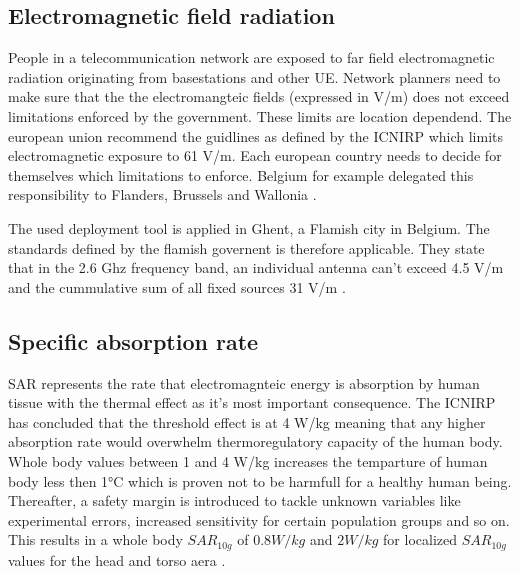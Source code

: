 \subsection{Electromagnetic field radiation} %
\label{sub:emf}
People in a telecommunication network are exposed to far field electromagnetic radiation originating from basestations and other \gls{UE}. 
Network planners need to make sure that the the electromangteic fields (expressed in V/m) does not exceed limitations enforced 
by the government. These limits are location dependend. The european union recommend the guidlines as defined by the \gls{ICNIRP} which limits electromagnetic exposure to 61 V/m.
Each european country needs to decide for themselves which limitations to enforce. Belgium for example delegated this responsibility to Flanders, Brussels and Wallonia \cite{J23}.

The used deployment tool is applied in Ghent, a Flamish city in Belgium. The standards defined by the flamish governent is therefore applicable.
They state that in the 2.6 Ghz frequency band, an individual antenna can't exceed 4.5 V/m and the cummulative sum of all fixed sources 31 V/m \cite{S13_normenBelgie}.

\subsection{Specific absorption rate}

\gls{SAR} represents the rate that electromagnteic energy is absorption by human tissue with the thermal effect as it's most important consequence.
The \gls{ICNIRP} has concluded that the threshold effect is at 4 W/kg meaning that any higher absorption rate would overwhelm thermoregulatory capacity of the human body.
Whole body values between 1 and 4 W/kg increases the temparture of human body less then 1°C which is proven not to be harmfull for a healthy human being\cite{J24}.
Thereafter, a safety margin is introduced to tackle unknown variables like experimental errors, increased sensitivity for certain population groups and so on. This results 
in a whole body $SAR_{10g}$ of $0.8 W/kg$ and $2 W/kg$ for localized $SAR_{10g}$ values for the head and torso aera \cite{J23}.




